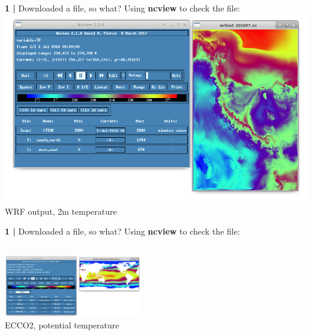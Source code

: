 \begin{frame}{\textbf{1 |} Downloaded a file, so what?}
    Using  \textbf{ncview} to check the file:
    \includegraphics[scale=0.3]{images/wrf_RIS.png}\\
        \centering\tiny{WRF output, 2m temperature}
\end{frame}


\begin{frame}{\textbf{1 |} Downloaded a file, so what?}
    Using \textbf{ncview} to check the file:
    \begin{columns}
        \column[c]{6.5cm}
            \centering\includegraphics[width=6cm]{images/Theta.png} \\
                \centering\tiny{ECCO2, potential temperature}
        \column[c]{6.5cm}
    \end{columns}
\end{frame}


